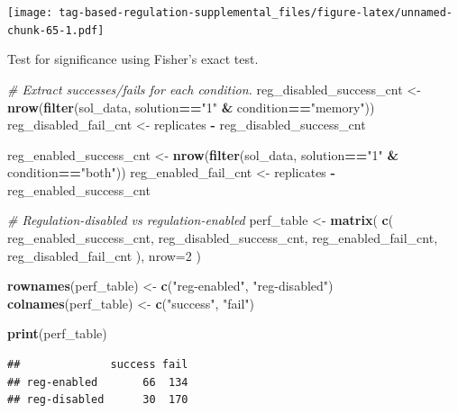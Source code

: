 \documentclass[
]{book}
\newenvironment{Shaded}{\begin{snugshade}}{\end{snugshade}}
\newcommand{\CommentTok}[1]{\textcolor[rgb]{0.56,0.35,0.01}{\textit{#1}}}
\newcommand{\DataTypeTok}[1]{\textcolor[rgb]{0.13,0.29,0.53}{#1}}
\newcommand{\DecValTok}[1]{\textcolor[rgb]{0.00,0.00,0.81}{#1}}
\newcommand{\KeywordTok}[1]{\textcolor[rgb]{0.13,0.29,0.53}{\textbf{#1}}}
\newcommand{\NormalTok}[1]{#1}
\newcommand{\OperatorTok}[1]{\textcolor[rgb]{0.81,0.36,0.00}{\textbf{#1}}}
\newcommand{\StringTok}[1]{\textcolor[rgb]{0.31,0.60,0.02}{#1}}
\begin{document}
\texttt{[image: tag-based-regulation-supplemental\_files/figure-latex/unnamed-chunk-65-1.pdf]}

Test for significance using Fisher's exact test.

\begin{Shaded}
\begin{Highlighting}[]
\CommentTok{\# Extract successes/fails for each condition.}
\NormalTok{reg\_disabled\_success\_cnt \textless{}{-}}\StringTok{ }\KeywordTok{nrow}\NormalTok{(}\KeywordTok{filter}\NormalTok{(sol\_data, solution}\OperatorTok{==}\StringTok{"1"} \OperatorTok{\&}\StringTok{ }\NormalTok{condition}\OperatorTok{==}\StringTok{"memory"}\NormalTok{))}
\NormalTok{reg\_disabled\_fail\_cnt \textless{}{-}}\StringTok{ }\NormalTok{replicates }\OperatorTok{{-}}\StringTok{ }\NormalTok{reg\_disabled\_success\_cnt}

\NormalTok{reg\_enabled\_success\_cnt \textless{}{-}}\StringTok{ }\KeywordTok{nrow}\NormalTok{(}\KeywordTok{filter}\NormalTok{(sol\_data, solution}\OperatorTok{==}\StringTok{"1"} \OperatorTok{\&}\StringTok{ }\NormalTok{condition}\OperatorTok{==}\StringTok{"both"}\NormalTok{))}
\NormalTok{reg\_enabled\_fail\_cnt \textless{}{-}}\StringTok{ }\NormalTok{replicates }\OperatorTok{{-}}\StringTok{ }\NormalTok{reg\_enabled\_success\_cnt}

\CommentTok{\# Regulation{-}disabled vs regulation{-}enabled}
\NormalTok{perf\_table \textless{}{-}}\StringTok{ }\KeywordTok{matrix}\NormalTok{(}
  \KeywordTok{c}\NormalTok{(}
\NormalTok{    reg\_enabled\_success\_cnt,}
\NormalTok{    reg\_disabled\_success\_cnt,}
\NormalTok{    reg\_enabled\_fail\_cnt,}
\NormalTok{    reg\_disabled\_fail\_cnt}
\NormalTok{    ),}
    \DataTypeTok{nrow=}\DecValTok{2}
\NormalTok{)}

\KeywordTok{rownames}\NormalTok{(perf\_table) \textless{}{-}}\StringTok{ }\KeywordTok{c}\NormalTok{(}\StringTok{"reg{-}enabled"}\NormalTok{, }\StringTok{"reg{-}disabled"}\NormalTok{)}
\KeywordTok{colnames}\NormalTok{(perf\_table) \textless{}{-}}\StringTok{ }\KeywordTok{c}\NormalTok{(}\StringTok{"success"}\NormalTok{, }\StringTok{"fail"}\NormalTok{)}

\KeywordTok{print}\NormalTok{(perf\_table)}
\end{Highlighting}
\end{Shaded}

\begin{verbatim}
##              success fail
## reg-enabled       66  134
## reg-disabled      30  170
\end{verbatim}
\end{document}
